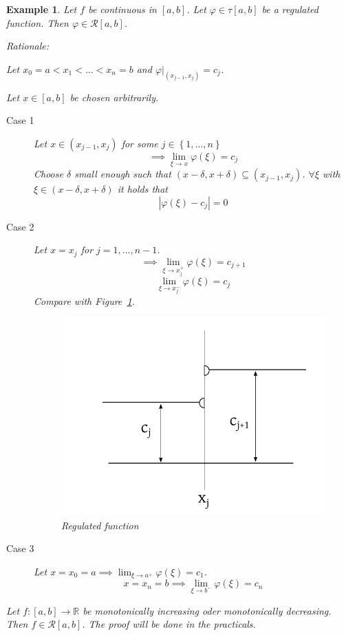 \documentclass{article}
\newtheorem{example}{Example}  \numberwithin{example}{section}
\newcommand{\set}[1]{\left\{#1\right\}}
\newcommand{\card}[1]{\left|#1\right|}
\begin{document}
\begin{example}
  Let $f$ be continuous in $[a,b]$.
  Let $\varphi \in \tau[a,b]$ be a regulated function. Then $\varphi \in \mathcal R[a,b]$.

  Rationale:

  Let $x_0 = a < x_1 < \dots < x_n = b$ and $\varphi|_{(x_{j-1}, x_j)} = c_j$.

  Let $x \in [a,b]$ be chosen arbitrarily.

  \begin{description}
    \item[Case 1]
      Let $x \in (x_{j-1}, x_j)$ for some $j \in \set{1, \dots, n}$
      \[ \implies \lim_{\xi\to x} \varphi(\xi) = c_j \]
      Choose $\delta$ small enough such that $(x - \delta, x + \delta) \subseteq (x_{j-1}, x_j)$.
      $\forall \xi$ with $\xi \in (x - \delta, x + \delta)$ it holds that
      \[ \card{\varphi(\xi) - c_j} = 0 \]
    \item[Case 2]
      Let $x = x_j$ for $j = 1, \dots, n-1$.
      \[ \implies \lim_{\xi \to x_j^+} \varphi(\xi) = c_{j+1} \]
      \[ \lim_{\xi \to x_j^-} \varphi(\xi) = c_j \]
      Compare with Figure~\ref{img:regf}.
      \begin{figure}
        \begin{center}
          \includegraphics{img/15_regulated_function.pdf}
          \caption{Regulated function}
          \label{img:regf}
        \end{center}
      \end{figure}
    \item[Case 3]
      Let $x = x_0 = a \implies \lim_{\xi \to a^+} \varphi(\xi) = c_1$.
      \[ x = x_n = b \implies \lim_{\xi \to b^-} \varphi(\xi) = c_n \]
  \end{description}

  Let $f: [a,b] \to \mathbb R$ be monotonically increasing oder monotonically decreasing.
  Then $f \in \mathcal R[a,b]$. The proof will be done in the practicals.
\end{example}
\end{document}
